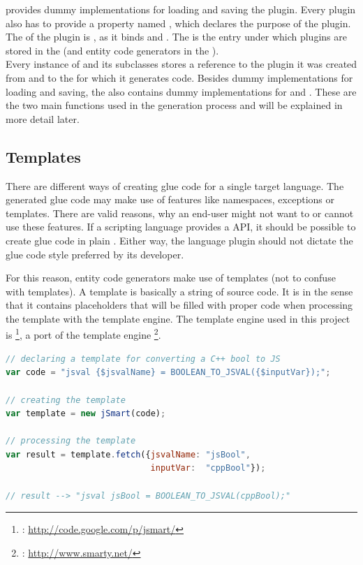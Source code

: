  provides dummy implementations for loading and saving the plugin. Every plugin also has to provide a property named , which declares the purpose of the plugin. The  of the  plugin is , as it binds  and . The  is the entry under which plugins are stored in the  (and entity code generators in the ).
\\Every instance of  and its subclasses stores a reference to the plugin it was created from and to the  for which it generates code. Besides dummy implementations for loading and saving, the  also contains dummy implementations for  and . These are the two main functions used in the generation process and will be explained in more detail later.

\subsection{Templates}

There are different ways of creating glue code for a single target language. The generated glue code may make use of  features like namespaces, exceptions or templates. There are valid reasons, why an end-user might not want to or cannot use these features. If a scripting language provides a  API, it should be possible to create glue code in plain . Either way, the language plugin should not dictate the glue code style preferred by its developer.

For this reason, entity code generators make use of templates (not to confuse with  templates). A template is basically a string of  source code. It is  in the sense that it contains placeholders that will be filled with proper code when processing the template with the template engine. The template engine used in this project is \footnote{: \url{http://code.google.com/p/jsmart/}}, a  port of the  template engine \footnote{: \url{http://www.smarty.net/}}.

\SingleSpacing
\begin{lstlisting}[language=JavaScript, caption=Example of using a \myProperName{jSmart} template (for type conversion), label=lst:TemplateBool]
// declaring a template for converting a C++ bool to JS
var code = "jsval {$jsvalName} = BOOLEAN_TO_JSVAL({$inputVar});";

// creating the template
var template = new jSmart(code);

// processing the template
var result = template.fetch({jsvalName: "jsBool", 
                             inputVar:  "cppBool"});
                             
// result --> "jsval jsBool = BOOLEAN_TO_JSVAL(cppBool);"
\end{lstlisting}
\OnehalfSpacing

